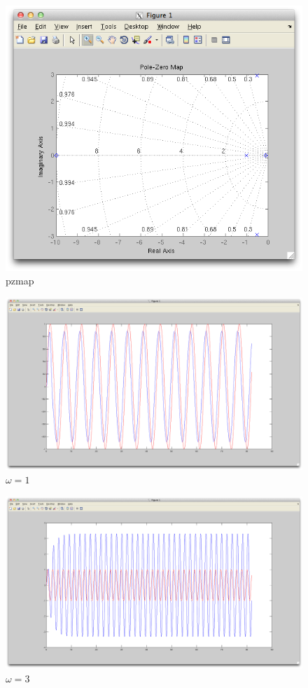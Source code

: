 \documentclass[]{article}
\begin{document}
\begin{figure}[hbt]
  \centering
  \includegraphics[width=15.0cm]{pzmap.png}
  \caption{pzmap}
\end{figure}
\begin{figure}[hbt]
  \centering
  \includegraphics[width=15.0cm]{omega 1.png}
  \caption{$\omega = 1$}
\end{figure}
\begin{figure}[hbt]
  \centering
  \includegraphics[width=15.0cm]{omega 3.png}
  \caption{$\omega = 3$}
\end{figure}
\end{document}

